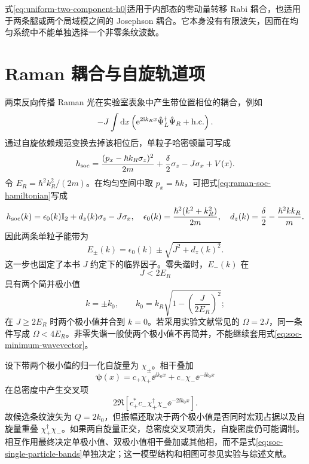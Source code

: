 式\eqref{eq:uniform-two-component-h0}适用于内部态的零动量转移 Rabi 耦合，也适用于两条腿或两个局域模之间的 Josephson 耦合。它本身没有有限波矢，因而在均匀系统中不能单独选择一个非零条纹波数。

\section{Raman 耦合与自旋轨道项}

两束反向传播 Raman 光在实验室表象中产生带位置相位的耦合，例如
\begin{equation}
  -J\int\mathop{}\!\mathrm{d} x\left(
  \mathrm{e}^{2\mathrm{i} k_Rx}\hat\Psi_L^\dagger\hat\Psi_R+{\rm h.c.}
  \right).
  \label{eq:raman-lab-coupling}
\end{equation}
通过自旋依赖规范变换去掉该相位后，单粒子哈密顿量可写成
\begin{equation}
  h_{\rm soc}=
  \frac{(p_x-\hbar k_R\sigma_z)^2}{2m}
  +\frac{\delta}{2}\sigma_z-J\sigma_x+V(x).
  \label{eq:raman-soc-hamiltonian}
\end{equation}
令 $E_R=\hbar^2k_R^2/(2m)$。在均匀空间中取 $p_x=\hbar k$，可把式\eqref{eq:raman-soc-hamiltonian}写成
\begin{equation}
  h_{\rm soc}(k)=\epsilon_0(k)\mathbb{I}_2+d_z(k)\sigma_z-J\sigma_x,
  \quad
  \epsilon_0(k)=\frac{\hbar^2(k^2+k_R^2)}{2m},
  \quad
  d_z(k)=\frac{\delta}{2}-\frac{\hbar^2kk_R}{m}.
  \label{eq:soc-bloch-vector}
\end{equation}
因此两条单粒子能带为
\begin{equation}
  E_\pm(k)=\epsilon_0(k)\pm\sqrt{J^2+d_z(k)^2}.
  \label{eq:soc-single-particle-bands}
\end{equation}
这一步也固定了本书 $J$ 约定下的临界因子。零失谐时，$E_-(k)$ 在
\begin{equation}
  J<2E_R
  \label{eq:soc-double-minimum-condition}
\end{equation}
具有两个简并极小值
\begin{equation}
  k=\pm k_0,
  \qquad
  k_0=k_R\sqrt{1-\left(\frac{J}{2E_R}\right)^2};
  \label{eq:soc-minimum-wavevector}
\end{equation}
在 $J\geq2E_R$ 时两个极小值并合到 $k=0$。若采用实验文献常见的 $\Omega=2J$，同一条件写成 $\Omega<4E_R$。非零失谐一般使两个极小值不再简并，不能继续套用式\eqref{eq:soc-minimum-wavevector}。

设下带两个极小值的归一化自旋量为 $\chi_\pm$。相干叠加
\begin{equation}
  \bm\psi(x)=c_+\chi_+\ee^{\ii k_0x}
  +c_-\chi_-\ee^{-\ii k_0x}
  \label{eq:soc-two-minimum-superposition}
\end{equation}
在总密度中产生交叉项
\begin{equation}
  2\Re\!\left[c_+^*c_-\chi_+^\dagger\chi_-
  \ee^{-2\ii k_0x}\right].
  \label{eq:soc-stripe-overlap}
\end{equation}
故候选条纹波矢为 $Q=2k_0$，但振幅还取决于两个极小值是否同时宏观占据以及自旋量重叠 $\chi_+^\dagger\chi_-$。如果两自旋量正交，总密度交叉项消失，自旋密度仍可能调制。相互作用最终决定单极小值、双极小值相干叠加或其他相，而不是式\eqref{eq:soc-single-particle-bands}单独决定；这一模型结构和相图可参见实验与综述文献\cite{Lin2011,Li2012,Zhai2015}。


